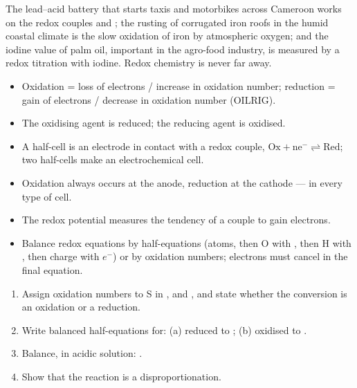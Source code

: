 \documentclass[11pt]{article}
\begin{document}
\begin{savaistu}
The lead–acid battery that starts taxis and motorbikes across Cameroon works on the redox couples  and ; the rusting of corrugated iron roofs in the humid coastal climate is the slow oxidation of iron by atmospheric oxygen; and the iodine value of palm oil, important in the agro-food industry, is measured by a redox titration with iodine. Redox chemistry is never far away.
\end{savaistu}

\begin{aretenir}
\begin{itemize}
\item Oxidation = loss of electrons / increase in oxidation number; reduction = gain of electrons / decrease in oxidation number (OILRIG).
\item The oxidising agent is reduced; the reducing agent is oxidised.
\item A half-cell is an electrode in contact with a redox couple, \ensuremath{\mathrm{Ox + ne^{-} \rightleftharpoons  Red}}; two half-cells make an electrochemical cell.
\item Oxidation always occurs at the anode, reduction at the cathode — in every type of cell.
\item The redox potential measures the tendency of a couple to gain electrons.
\item Balance redox equations by half-equations (atoms, then O with , then H with , then charge with $e^-$) or by oxidation numbers; electrons must cancel in the final equation.
\end{itemize}
\end{aretenir}

\begin{exercice}[Practice]
\begin{enumerate}
\item Assign oxidation numbers to S in ,  and , and state whether the conversion  is an oxidation or a reduction.
\item Write balanced half-equations for: (a)  reduced to ; (b)  oxidised to .
\item Balance, in acidic solution: .
\item Show that the reaction  is a disproportionation.
\end{enumerate}
\end{exercice}
\end{document}
